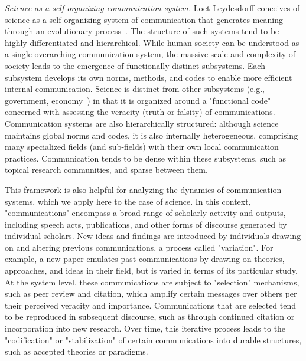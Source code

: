 \documentclass[12pt]{article} %
\begin{document}
\textit{Science as a self-organizing communication system.}
Loet Leydesdorff conceives of science as a self-organizing system of communication that generates meaning through an evolutionary process~\cite{leydesdorff2001sociological,leydesdorff1997nonlinear}. 
The structure of such systems tend to be highly differentiated and hierarchical.
While human society can be understood as a single overarching communication system, the massive scale and complexity of society leads to the emergence of functionally distinct subsystems.
Each subsystem develops its own norms, methods, and codes to enable more efficient internal communication.
Science is distinct from other subsystems (e.g., government, economy~\cite{leydesdorff1996helix}) in that it is organized around a "functional code" concerned with assessing the veracity (truth or falsity) of communications.
Communication systems are also hierarchically structured: although science maintains global norms and codes, it is also internally heterogeneous, comprising many specialized fields (and sub-fields) with their own local communication practices.
Communication tends to be dense within these subsystems, such as topical research communities, and sparse between them.

This framework is also helpful for analyzing the dynamics of communication systems, which we apply here to the case of science.
In this context, "communications" encompass a broad range of scholarly activity and outputs, including speech acts, publications, and other forms of discourse generated by individual scholars.
New ideas and findings are introduced by individuals drawing on and altering previous communications, a process called "variation".
For example, a new paper emulates past communications by drawing on theories, approaches, and ideas in their field, but is varied in terms of its particular study. 
At the system level, these communications are subject to "selection" mechanisms, such as peer review and citation, which amplify certain messages over others per their perceived veracity and importance.
Communications that are selected tend to be reproduced in subsequent discourse, such as through continued citation or incorporation into new research.
Over time, this iterative process leads to the "codification" or "stabilization" of certain communications into durable structures, such as accepted theories or paradigms.
\end{document}
